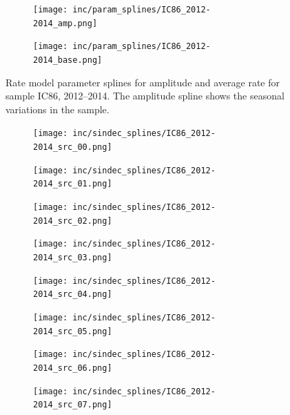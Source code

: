 \begin{enumerate}
\begin{figure}[h]
  \centering
  \begin{subfigure}[c]{0.49\textwidth}
    \texttt{[image: inc/param\_splines/IC86\_2012-2014\_amp.png]}
  \end{subfigure}
  \hfill
  \begin{subfigure}[c]{0.49\textwidth}
    \texttt{[image: inc/param\_splines/IC86\_2012-2014\_base.png]}
  \end{subfigure}
  \caption{Rate model parameter splines for amplitude and average rate for sample IC86, 2012–2014. The amplitude spline shows the seasonal variations in the sample.}
  \label{fig:param_splines}
\end{figure}

\begin{figure}[h] %
  \centering
  \begin{subfigure}[c]{0.24\textwidth}
    \texttt{[image: inc/sindec\_splines/IC86\_2012-2014\_src\_00.png]}
  \end{subfigure}
  \hfill
  \begin{subfigure}[c]{0.24\textwidth}
    \texttt{[image: inc/sindec\_splines/IC86\_2012-2014\_src\_01.png]}
  \end{subfigure}
  \hfill
  \begin{subfigure}[c]{0.24\textwidth}
    \texttt{[image: inc/sindec\_splines/IC86\_2012-2014\_src\_02.png]}
  \end{subfigure}
  \hfill
  \begin{subfigure}[c]{0.24\textwidth}
    \texttt{[image: inc/sindec\_splines/IC86\_2012-2014\_src\_03.png]}
  \end{subfigure}

  \begin{subfigure}[c]{0.24\textwidth}
    \texttt{[image: inc/sindec\_splines/IC86\_2012-2014\_src\_04.png]}
  \end{subfigure}
  \hfill
  \begin{subfigure}[c]{0.24\textwidth}
    \texttt{[image: inc/sindec\_splines/IC86\_2012-2014\_src\_05.png]}
  \end{subfigure}
  \hfill
  \begin{subfigure}[c]{0.24\textwidth}
    \texttt{[image: inc/sindec\_splines/IC86\_2012-2014\_src\_06.png]}
  \end{subfigure}
  \hfill
  \begin{subfigure}[c]{0.24\textwidth}
    \texttt{[image: inc/sindec\_splines/IC86\_2012-2014\_src\_07.png]}
  \end{subfigure}


\end{figure}
\end{enumerate}
